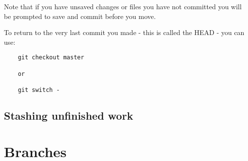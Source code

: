 Note that if you have unsaved changes or files you have not committed you will be prompted to save and commit before you move.

To return to the very last commit you made - this is called the HEAD - you can use:

\begin{verbatim}
    git checkout master

	or

	git switch -
\end{verbatim}

\subsection{Stashing unfinished work}


\section{Branches}
